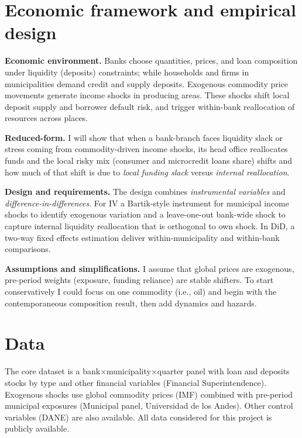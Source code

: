 \section{ Economic framework and empirical design} \label{section:efed} 

\noindent \textbf{Economic environment.} Banks choose quantities, prices, and loan composition under liquidity (deposits) constraints;  while households and firms in municipalities demand credit and supply deposits. Exogenous commodity price movements generate income shocks in producing areas. These shocks shift local deposit supply and borrower default risk, and trigger within-bank reallocation of resources across places.

\noindent \textbf{Reduced-form.} I will show that when a bank-branch faces liquidity slack or stress coming from commodity-driven income shocks, its head office reallocates funds and the local risky mix (consumer and microcredit loans share) shifts and how much of that shift is due to \textit{local funding slack} versus \textit{internal reallocation}.
 
\noindent \textbf{Design and requirements.} The design combines \textit{instrumental variables} and \textit{difference-in-differences}. For IV a Bartik-style instrument for municipal income shocks to identify exogenous variation and a leave-one-out bank-wide shock to capture internal liquidity reallocation that is orthogonal to own shock. In DiD, a two-way fixed effects estimation deliver within-municipality and within-bank comparisons.

\noindent \textbf{Assumptions and simplifications.} I assume that global prices are exogenous, pre-period weights (exposure, funding reliance) are stable shifters. To start conservatively I could focus on one commodity (i.e., oil) and begin with the contemporaneous composition result, then add dynamics and hazards.


\section{ Data} \label{section:data} 

\noindent The core dataset is a bank$\times$municipality$\times$quarter panel with loan and deposits stocks by type and other financial variables (Financial Superintendence). Exogenous shocks use global commodity prices (IMF) combined with pre-period municipal exposures (Municipal panel, Universidad de los Andes). Other control variables (DANE) are also available. All data considered for this project is publicly available.


\singlespacing

%

\pagebreak
\renewcommand*{\thepage}{A.\arabic{page}}
\setcounter{page}{0}
\setcounter{equation}{0}
\renewcommand{\theequation}{A.\arabic{equation}}
\setcounter{section}{0}
\renewcommand{\thesection}{A.\arabic{section}}
\renewcommand{\thefigure}{A.\arabic{figure}}
\setcounter{figure}{0}
\renewcommand{\thetable}{A.\arabic{table}}
\setcounter{table}{0}
\thispagestyle{empty}


